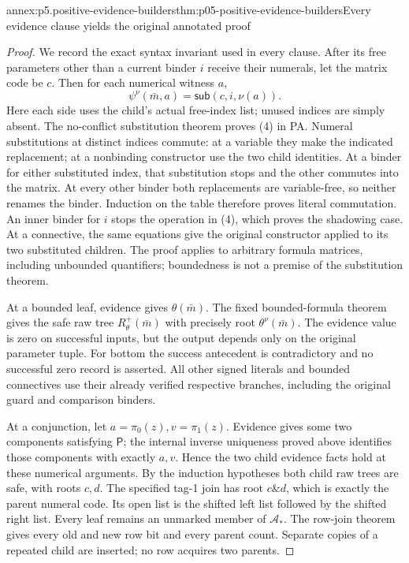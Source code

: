 \begin{annexitem}{annex:p5.positive-evidence-builders}{thm:p05-positive-evidence-builders}{Every evidence clause yields the original annotated proof}
\begin{proof}
We record the exact syntax invariant used in every clause. After its
free parameters other than a current binder \(i\) receive their
numerals, let the matrix code be \(c\). Then for each numerical
witness \(a\),
\[
              \psi^\nu(\bar m,a)=\mathsf{sub}(c,i,\nu(a)).
\tag{4}
\]
Here each side uses the child's actual free-index list; unused indices
are simply absent. The no-conflict substitution theorem proves (4) in
PA. Numeral substitutions at distinct indices commute: at a variable
they make the indicated replacement; at a nonbinding constructor use
the two child identities. At a binder for either substituted index,
that substitution stops and the other commutes into the matrix. At
every other binder both replacements are variable-free, so neither
renames the binder. Induction on the table therefore proves literal
commutation. An inner binder for \(i\) stops the operation in (4),
which proves the shadowing case. At a connective, the same equations
give the original constructor applied to its two substituted children.
The proof applies to arbitrary formula matrices, including unbounded
quantifiers; boundedness is not a premise of the substitution theorem.

At a bounded leaf, evidence gives \(\theta(\bar m)\). The fixed
bounded-formula theorem gives the safe raw tree
\(R_\theta^+(\bar m)\) with precisely root
\(\theta^\nu(\bar m)\). The evidence value is zero on successful
inputs, but the output depends only on the original parameter tuple.
For bottom the success antecedent is contradictory and no successful
zero record is asserted. All other signed literals and bounded
connectives use their already verified respective branches, including
the original guard and comparison binders.

At a conjunction, let \(a=\pi_0(z),v=\pi_1(z)\). Evidence gives
some two components satisfying \(\mathsf P\); the internal inverse
uniqueness proved above identifies those components with exactly
\(a,v\). Hence the two child evidence facts hold at these numerical
arguments. By the induction hypotheses both child raw trees are safe,
with roots \(c,d\). The specified tag-1 join has root
\(c\mathbin{\&}d\), which is exactly the parent numeral code.
Its open list is the shifted left list followed by the shifted right
list. Every leaf remains an unmarked member of \(\mathcal A_*\).
The row-join theorem gives every old and new row bit and every parent
count. Separate copies of a repeated child are inserted; no row acquires
two parents.


\end{proof}
\end{annexitem}
